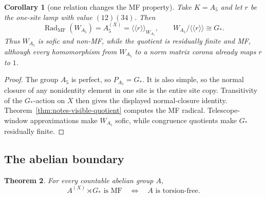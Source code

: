 \documentclass[11pt]{amsart}
\newtheorem{theorem}{Theorem}[section]
\newtheorem{corollary}[theorem]{Corollary}
\theoremstyle{definition}
\theoremstyle{remark}
\theoremstyle{plain}
\begin{document}
\begin{corollary}[one relation changes the MF property]
\label{cor:notes-a5-relation}
Take $K=A_5$ and let $r$ be the one-site lamp with value $(12)(34)$.  Then
\[
 \operatorname{Rad}_{\mathrm{MF}}(W_{A_5})
 =A_5^{(X)}
 =\langle\!\langle r\rangle\!\rangle_{W_{A_5}},
 \qquad
 W_{A_5}/\langle\!\langle r\rangle\!\rangle\cong G_*.
\]
Thus $W_{A_5}$ is sofic and non-MF, while the quotient is residually finite
and MF, although every homomorphism from $W_{A_5}$ to a norm matrix corona
already maps $r$ to $1$.
\end{corollary}

\begin{proof}
The group $A_5$ is perfect, so $P_{A_5}=G_*$.  It is also simple, so the
normal closure of any nonidentity element in one site is the entire site
copy.  Transitivity of the $G_*$-action on $X$ then gives the displayed
normal-closure identity.  Theorem~\ref{thm:notes-visible-quotient} computes
the MF radical.  Telescope-window approximations make $W_{A_5}$ sofic, while
congruence quotients make $G_*$ residually finite.
\end{proof}

\subsection{The abelian boundary}

\begin{theorem}\label{thm:notes-abelian-boundary}
For every countable abelian group $A$,
\[
 A^{(X)}\rtimes G_*\text{ is MF}
 \quad\Longleftrightarrow\quad
 A\text{ is torsion-free}.
\]
\end{theorem}
\end{document}
